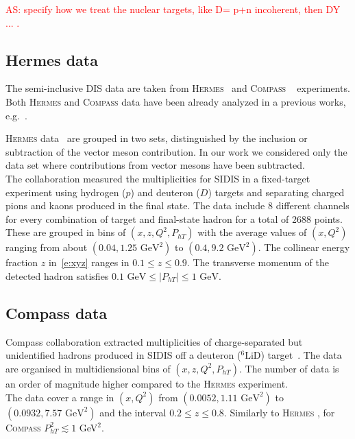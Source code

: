 \documentclass[aps,preprintnumbers,showpacs,nofootinbib,superscriptaddress,floatfix]{revtex4}
\newcommand{\hermes}{\textsc{Hermes }}
\newcommand{\compass}{\textsc{Compass }}
\newcommand{\Tperp}{T}
\begin{document}
\textcolor{red}{AS: specify how we treat the nuclear targets, like D= p+n incoherent, then DY ... .}

\subsection{Hermes data}
\label{ss:hermes}

The semi-inclusive DIS data are taken from \textsc{Hermes}~\cite{Airapetian:2012ki} and \compass~\cite{Adolph:2013stb} experiments. 
Both \textsc{Hermes} and \compass data have been already analyzed in a previous works, e.g.~\cite{Signori:2013mda,Anselmino:2013lza}.

\textsc{Hermes} data~\cite{Airapetian:2012ki} are grouped in two sets, distinguished by the inclusion or subtraction of the vector meson contribution. In our work we considered only the data set where contributions from vector mesons have been subtracted. \\
The collaboration measured the multiplicities for SIDIS in a fixed-target experiment using hydrogen ($p$) and deuteron ($D$) targets and separating charged pions and kaons produced in the final state. The data include 8 different channels for every combination of target and final-state hadron for a total of 2688 points.\\
These are grouped in bins of $(x,z,Q^2,P_{hT})$ with the average values of $(x,Q^2)$ ranging from about $(0.04, 1.25\text{ GeV}^2)$ to $(0.4, 9.2\text{ GeV}^2)$. 
The collinear energy fraction $z$ in~\eqref{e:xyz} ranges in $0.1\leq z\leq 0.9$. The transverse momenum of the detected hadron satisfies $0.1 \text{ GeV} \leq \vert P_{hT} \vert \leq 1 \text{ GeV}$.

\subsection{Compass data}
\label{ss:compass}

Compass collaboration extracted multiplicities of charge-separated but unidentified hadrons produced in SIDIS off a deuteron ($^6\text{LiD}$) target~\cite{Adolph:2013stb}. 
The data are organised in multidiensional bins of $(x,z,Q^2,P_{h\Tperp})$. The number of data is an order of magnitude higher compared to the \textsc{Hermes} experiment. \\
The data cover a range in $(x,Q^2)$ from $(0.0052, 1.11\text{ GeV}^2)$ to $(0.0932, 7.57\text{ GeV}^2)$ and the interval $0.2 \leq z \leq 0.8$. Similarly to \hermes, for \compass $P_{h\Tperp}^2 \lesssim 1$ GeV$^2$. 
\end{document}
